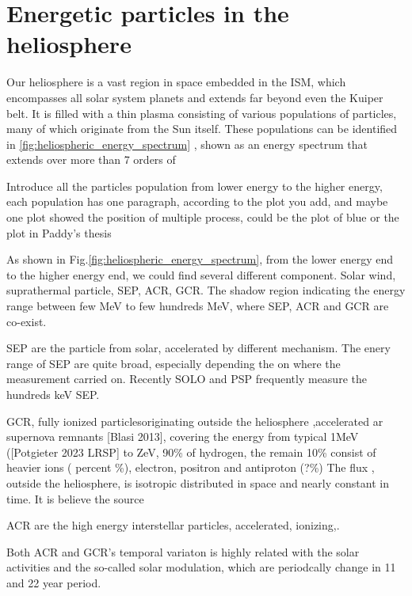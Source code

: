 \section{Energetic particles in the heliosphere}
\label{sec:particles_heliosphere}


Our heliosphere is a vast region in space embedded in the \ac{ISM}, which encompasses all solar system planets and extends far beyond even the Kuiper belt. 
It is filled with a thin plasma consisting of various populations of particles, many of which originate from the Sun itself. These populations can be identified in \autoref{fig:heliospheric_energy_spectrum} \citep[based on measurements by][]{Mewaldt-2001}, shown as an energy spectrum that extends over more than 7 orders of 


Introduce all the particles population from lower energy to the higher energy, each population has one paragraph, according to the plot you add, and maybe one plot showed the position of multiple process, could be the plot of blue or the plot in Paddy's thesis

As shown in Fig.\ref{fig:heliospheric_energy_spectrum}, from the lower energy end to the higher energy end, we could find several different component. Solar wind, suprathermal particle, SEP, ACR, GCR. 
The shadow region indicating the energy range between few MeV to few hundreds MeV, where SEP, ACR and GCR are co-exist. 


SEP are the particle from solar, accelerated by different mechanism.
The enery range of SEP are quite broad, especially depending the on where the measurement carried on. Recently SOLO and PSP frequently measure the hundreds keV SEP.



GCR, fully ionized particlesoriginating outside the heliosphere ,accelerated ar supernova remnants [Blasi 2013], covering the energy from typical 1MeV ([Potgieter 2023 LRSP] to ZeV, 90\% of hydrogen, the remain 10\% consist of heavier ions ( percent \%), electron, positron and antiproton (?\%)
The flux , outside the heliosphere,  is isotropic distributed in space and nearly constant in time.  It is believe the source 

ACR are the high energy interstellar particles, accelerated, ionizing,. 


Both ACR and GCR's temporal variaton is highly related with the solar activities and the so-called solar modulation, which are periodcally change in 11 and 22 year period. 

